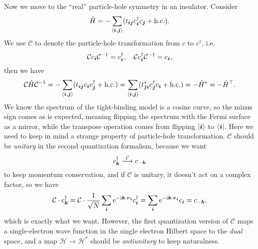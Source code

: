 \documentclass[hyperref, a4paper]{article}
\newcommand*{\ii}{\mathrm{i}}
\newcommand*{\ee}{\mathrm{e}}
\newcommand*{\pair}[1]{\langle #1 \rangle}
\begin{document}
Now we move to the ``real'' particle-hole symmetry in an insulator. Consider 
\begin{equation}
    \hat{H} = - \sum_{\pair{\vb*{i}, \vb*{j}}} (t_{\vb*{i} \vb*{j}} c^\dagger_{\vb*{i}} c_{\vb*{j}} + \text{h.c.}).
\end{equation}
We use $\mathcal{C}$ to denote the particle-hole transformation from $c$ to $c^\dagger$, i.e.
\begin{equation}
    \mathcal{C} c_{\vb*{i}} \mathcal{C}^{-1} = c_{\vb*{i}}^\dagger, \quad \mathcal{C} c_{\vb*{i}}^\dagger \mathcal{C}^{-1} = c_{\vb*{i}},
\end{equation}
then we have 
\begin{equation}
    \mathcal{C} \hat{H} \mathcal{C}^{-1} = - \sum_{\pair{\vb*{i}, \vb*{j}}} (t_{\vb*{i} \vb*{j}} c_{\vb*{i}} c^\dagger_{\vb*{j}} + \text{h.c.}) = \sum_{\pair{\vb*{i}, \vb*{j}}} (t_{\vb*{j} \vb*{i}}^* c^\dagger_{\vb*{j}} c_{\vb*{i}} + \text{h.c.}) = - \hat{H}^* = - \hat{H}^\top.
\end{equation}
We know the spectrum of the tight-binding model is a cosine curve, so the minus sign comes as is expected, meaning flipping the spectrum with the Fermi surface as a mirror, while the transpose 
operation comes from flipping $\ket{\vb*{i}}$ to $\bra{\vb*{i}}$. Here we need to keep in mind a strange property 
of particle-hole transformation. $\mathcal{C}$ should be \emph{unitary} in the second quantization formalism, because 
we want 
\begin{equation}
    c_{\vb*{k}}^\dagger \stackrel{\mathcal{C}}{\longrightarrow} c_{- \vb*{k}}
\end{equation}
to keep momentum conservation, and if $\mathcal{C}$ is unitary, it doesn't act on a complex factor, so we have 
\[
    \mathcal{C} \cdot c_{\vb*{k}}^\dagger = \mathcal{C} \cdot \frac{1}{\sqrt{N}} \sum_{\vb*{i}} \ee^{- \ii \vb*{k} \cdot \vb*{r}_{\vb*{i}}} c^\dagger_{\vb*{i}} = \sum_{\vb*{i}} \ee^{- \ii \vb*{k} \cdot \vb*{r}_{\vb*{i}}} c_{\vb*{i}} = c_{- \vb*{k}},
\]
which is exactly what we want. However, the first quantization version of $\mathcal{C}$ maps a single-electron 
wave function in the single electron Hilbert space to the \emph{dual} space, and a map $\mathcal{H} \to \mathcal{H}^*$
should be \emph{antiunitary} to keep naturalness.
\end{document}
